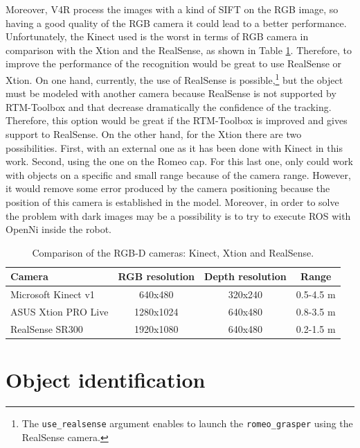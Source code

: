 \documentclass[12pt,a4paper,final,twoside,openright]{report}
\begin{document}
Moreover, V4R process the images with a kind of SIFT on the RGB image, so having a good quality of the RGB camera it could lead to a better performance. Unfortunately, the Kinect used is the worst in terms of RGB camera in comparison with the Xtion and the RealSense, as shown in Table \ref{tab:camera_comparison}. Therefore, to improve the performance of the recognition would be great to use RealSense or Xtion. On one hand, currently, the use of RealSense is possible,\footnote{The \texttt{use\_realsense} argument enables to launch the \texttt{romeo\_grasper} using the RealSense camera.} but the object must be modeled with another camera because RealSense is not supported by RTM-Toolbox and that decrease dramatically the confidence of the tracking. Therefore, this option would be great if the RTM-Toolbox is improved and gives support to RealSense. On the other hand, for the Xtion there are two possibilities. First, with an external one as it has been done with Kinect in this work. Second, using the one on the Romeo cap. For this last one, only could work with objects on a specific and small range because of the camera range. However, it would remove some error produced by the camera positioning because the position of this camera is established in the model. Moreover, in order to solve the problem with dark images may be a possibility is to try to execute ROS with OpenNi inside the robot.  

\begin{table}[h]
\begin{center}
\begin{tabular}{|l|c|c|c|}
\hline
\textbf{Camera} & \textbf{RGB resolution} & \textbf{Depth resolution} & \textbf{Range} \\ \hline
Microsoft Kinect v1 \cite{Smeenk}& 640x480 & 320x240 & 0.5-4.5 m \\
ASUS Xtion PRO Live \cite{ASUSWeb}& 1280x1024 & 640x480 & 0.8-3.5 m \\
RealSense SR300 \cite{IntelWeb}& 1920x1080 & 640x480 & 0.2-1.5 m \\ \hline
\end{tabular}
\caption{Comparison of the RGB-D cameras: Kinect, Xtion and RealSense.\label{tab:camera_comparison}}
\end{center}
\end{table}

\section{Object identification}
\label{sec:object_ident}
\end{document}
